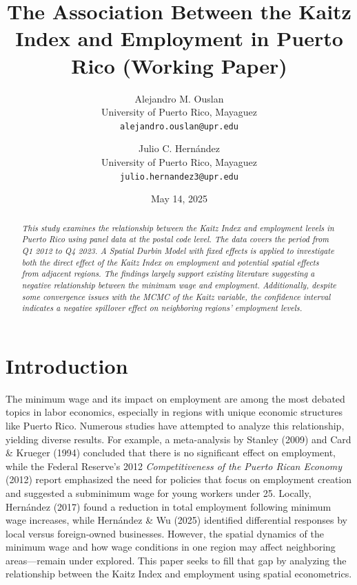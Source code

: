 \documentclass[12pt]{article}
\title{The Association Between the Kaitz Index and Employment in Puerto Rico (Working Paper)}
\author{
  Alejandro M. Ouslan \\
  \small{University of Puerto Rico, Mayaguez} \\
  \small{\texttt{alejandro.ouslan@upr.edu}}
  \and
  Julio C. Hernández \\
  \small{University of Puerto Rico, Mayaguez} \\
  \small{\texttt{julio.hernandez3@upr.edu}}
}
\date{May 14, 2025}
\begin{document}
\maketitle

\singlespacing

\begin{abstract}
	\textit{
		This study examines the relationship between the Kaitz Index and employment levels in Puerto Rico using panel data at the
		postal code level. The data covers the period from Q1 2012 to Q4 2023. A Spatial Durbin Model with fixed effects is applied
		to investigate both the direct effect of the Kaitz Index on employment and potential spatial effects from adjacent regions.
		The findings largely support existing literature suggesting a negative relationship between the minimum wage and employment.
		Additionally, despite some convergence issues with the MCMC of the Kaitz variable, the confidence interval indicates a
		negative spillover effect on neighboring regions’ employment levels.
	}
\end{abstract}

\section{Introduction}

The minimum wage and its impact on employment are among the most debated topics in labor economics, especially in regions with
unique economic structures like Puerto Rico. Numerous studies have attempted to analyze this relationship, yielding diverse
results. For example, a meta-analysis by Stanley (2009) \cite{doucouliagos2009publication} and Card \& Krueger (1994) \cite{card1994comment} concluded that there is no significant
effect on employment, while the Federal Reserve's 2012 \textit{Competitiveness of the Puerto Rican Economy} (2012) \cite{torres2012competitividad} report emphasized
the need for policies that focus on employment creation and suggested a subminimum wage for young workers under 25. Locally,
Hernández (2017) found a reduction in total employment following minimum wage increases, while Hernández \& Wu (2025)
identified differential responses by local versus foreign-owned businesses. However, the spatial dynamics of the minimum
wage and how wage conditions in one region may affect neighboring areas—remain under explored. This paper seeks to fill that gap
by analyzing the relationship between the Kaitz Index \cite{williams1998minimum} and employment using spatial econometrics.
\end{document}
